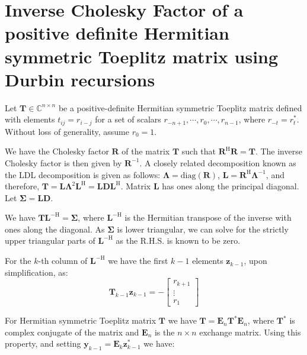 \section{Inverse Cholesky Factor of a positive definite Hermitian symmetric Toeplitz matrix using Durbin recursions}
\label{sec:001_inverse}

Let $\boldsymbol{T} \in \mathbb{C}^{n \times n}$ be a positive-definite Hermitian symmetric Toeplitz matrix defined with elements $t_{ij} = r_{i-j}$ for a set of scalars $r_{-n+1}, \cdots, r_0, \cdots, r_{n-1}$, where $r_{-t} = r_t^*$. Without loss of generality, assume $r_0 = 1$.

We have the Cholesky factor $\boldsymbol{R}$ of the matrix $\boldsymbol{T}$ such that $\boldsymbol{R}^{\mathrm{H}} \boldsymbol{R} = \boldsymbol{T}$. The inverse Cholesky factor is then given by $\boldsymbol{R}^{-1}$. A closely related decomposition known as the LDL decomposition is given as follows: $\boldsymbol{\Lambda} = \text{diag}(\boldsymbol{R})$, $\boldsymbol{L} = \boldsymbol{R}^{\mathrm{H}} \boldsymbol{\Lambda}^{-1}$, and therefore, $\boldsymbol{T} = \boldsymbol{L} \boldsymbol{\Lambda}^2 \boldsymbol{L}^{\mathrm{H}} = \boldsymbol{L} \boldsymbol{D} \boldsymbol{L}^{\mathrm{H}}$. Matrix $\boldsymbol{L}$ has ones along the principal diagonal. Let $\boldsymbol{\Sigma} = \boldsymbol{L}\boldsymbol{D}$.

We have $\boldsymbol{T} \boldsymbol{L}^{-\mathrm{H}} = \boldsymbol{\Sigma}$, where $\boldsymbol{L}^{-\mathrm{H}}$ is the Hermitian transpose of the inverse with ones along the diagonal. As $\boldsymbol{\Sigma}$ is lower triangular, we can solve for the strictly upper triangular parts of $\boldsymbol{L}^{-\mathrm{H}}$ as the R.H.S. is known to be zero.

For the $k$-th column of $\boldsymbol{L}^{-\mathrm{H}}$ we have the first $k-1$ elements $\boldsymbol{z}_{k-1}$, upon simplification, as:
$$\boldsymbol{T}_{k-1} \boldsymbol{z}_{k-1} = - \begin{bmatrix} r_{k+1} \\ \vdots \\ r_1 \end{bmatrix}$$

For Hermitian symmetric Toeplitz matrix $\boldsymbol{T}$ we have $\boldsymbol{T} = \boldsymbol{E}_n \boldsymbol{T}^* \boldsymbol{E}_n$, where $\boldsymbol{T}^*$ is complex conjugate of the matrix and $\boldsymbol{E}_n$ is the $n \times n$ exchange matrix. Using this property, and setting $\boldsymbol{y}_{k-1} = \boldsymbol{E}_k \boldsymbol{z}^*_{k-1}$ we have:

